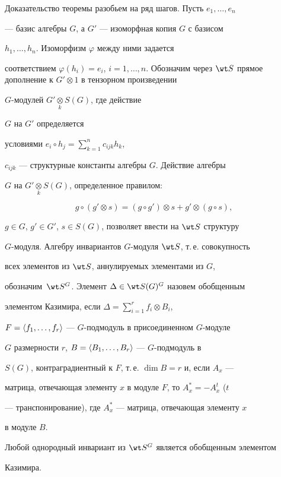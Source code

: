  


Доказательство теоремы разобьем на ряд шагов. Пусть $e_1,\dotsc,e_n$ 


--- базис алгебры $G$, а $G'$ --- изоморфная копия $G$ с базисом 


$h_1,\dotsc,h_n$. Изоморфизм $\varphi$ между ними задается 


соответствием $\varphi(h_i)=e_i$, $i=1,\dotsc,n$. Обозначим через $\wt 


S$ прямое дополнение к $G'\otimes1$ в тензорном произведении 


$G$-модулей $G'\underset{k}{\otimes}{} S(G)$, где действие


$G$ на $G'$ определяется 


условиями $e_i\circ h_j=\sum\limits^n_{k=1}c_{ijk}h_k$, 


$c_{ijk}$ --- структурные константы алгебры $G$. Действие алгебры 


$G$ на $G'\underset{k}{\otimes}{}S(G)$, определенное правилом: 


$$ 


g\circ(g'\otimes s)=(g\circ g')\otimes s+g'\otimes(g\circ s), 


$$ 


$g\in G$, $g'\in G'$, $s\in S(G)$, позволяет ввести на $\wt S$ структуру 


$G$-модуля. Алгебру инвариантов $G$-модуля $\wt S$, т.\,е. совокупность 


всех элементов из $\wt S$, аннулируемых элементами из $G$,


обозначим~$\wt S^G$. Элемент $\Delta\in\wt S(G)^G$ назовем обобщенным 


элементом Казимира, если $\Delta=\sum\limits^r_{i=1}f_i\otimes B_i$, 


$F=\langle f_1,\dotsc,f_r\rangle$ --- $G$-подмодуль в присоединенном $G$-модуле 


$G$ размерности $r$, $B=\langle B_1,\dotsc,B_r\rangle$ --- $G$-подмодуль в 


$S(G)$, контраградиентный к $F$, т.\,е. $\dim B=r$ и, если $A_x$ --- 


матрица, отвечающая элементу $x$ в модуле $F$, то $A^*_x=-A^t_x$ ($t$ 


--- транспонирование), где $A^*_x$ --- матрица, отвечающая элементу $x$ 


в модуле $B$. 


 


\begin{lem} 


Любой однородный инвариант из $\wt S^G$ является обобщенным элементом 


Казимира. 


\end{lem} 


